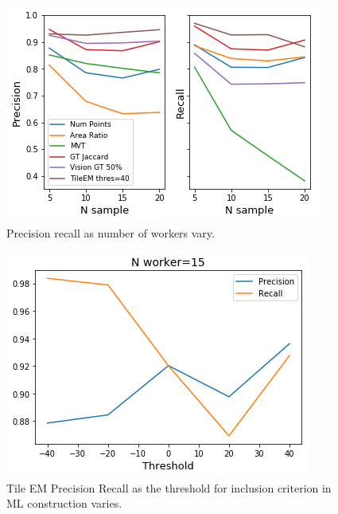 \documentclass[letterpaper]{article} %
\begin{document}
\begin{figure}
\centering
\includegraphics[width=\linewidth]{plots/PRSample2.png}
\caption{Precision recall as number of workers vary.}
\label{PRsample}
\end{figure}
\begin{figure}
\centering
\includegraphics[width=\linewidth]{plots/TileEMThreshold.png}
\caption{Tile EM Precision Recall as the threshold for inclusion criterion in ML construction varies.}
\label{TileEMThreshold}
\end{figure}
\end{document}

